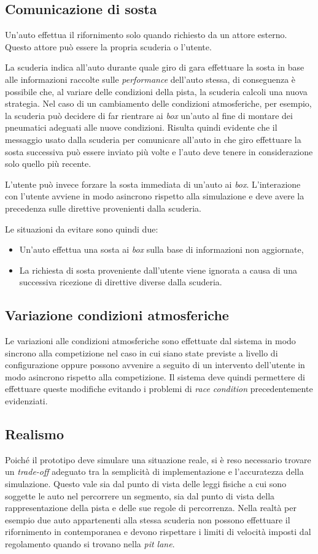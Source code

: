 \subsection*{Comunicazione di sosta}
Un'auto effettua il rifornimento solo quando richiesto da un attore esterno. Questo attore può essere la propria scuderia o l'utente.

La scuderia indica all'auto durante quale giro di gara effettuare la sosta in base alle informazioni raccolte sulle \textit{performance} dell'auto stessa, di conseguenza è possibile che, al variare delle condizioni della pista, la scuderia calcoli una nuova strategia. Nel caso di un cambiamento delle condizioni atmosferiche, per esempio, la scuderia può decidere di far rientrare ai \textit{box} un'auto al fine di montare dei pneumatici adeguati alle nuove condizioni. Risulta quindi evidente che il messaggio usato dalla scuderia per comunicare all'auto in che giro effettuare la sosta successiva può essere inviato più volte e l'auto deve tenere in considerazione solo quello più recente.

L'utente può invece forzare la sosta immediata di un'auto ai \textit{box}. L'interazione con l'utente avviene in modo asincrono rispetto alla simulazione e deve avere la precedenza sulle direttive provenienti dalla scuderia.

Le situazioni da evitare sono quindi due:
\begin{itemize}
\item Un'auto effettua una sosta ai \textit{box} sulla base di informazioni non aggiornate,
\item La richiesta di sosta proveniente dall'utente viene ignorata a causa di una successiva ricezione di direttive diverse dalla scuderia.
\end{itemize}

\subsection*{Variazione condizioni atmosferiche}
Le variazioni alle condizioni atmosferiche sono effettuate dal sistema in modo sincrono alla competizione nel caso in cui siano state previste a livello di configurazione oppure possono avvenire a seguito di un intervento dell'utente in modo asincrono rispetto alla competizione. Il sistema deve quindi permettere di effettuare queste modifiche evitando i problemi di \textit{race condition} precedentemente evidenziati.

\subsection*{Realismo}
Poiché il prototipo deve simulare una situazione reale, si è reso necessario trovare un \textit{trade-off} adeguato tra la semplicità di implementazione e l'accuratezza della simulazione. Questo vale sia dal punto di vista delle leggi fisiche a cui sono soggette le auto nel percorrere un segmento, sia dal punto di vista della rappresentazione della pista e delle sue regole di percorrenza. Nella realtà per esempio due auto appartenenti alla stessa scuderia non possono effettuare il rifornimento in contemporanea e devono rispettare i limiti di velocità imposti dal regolamento quando si trovano nella \textit{pit lane}.

